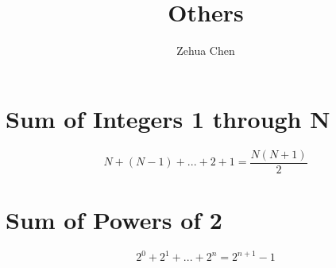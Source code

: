 \documentclass[11pt, letterpaper]{article}
\title{Others}
\author{Zehua Chen}
\begin{document}
  \section{Sum of Integers 1 through N}

    \begin{equation}
      N + \left( N - 1 \right) + ... + 2 + 1 = \frac{N \left( N + 1 \right)}{2}
    \end{equation}

  \section{Sum of Powers of 2}

    \begin{equation}
      2^{0} + 2^{1} + ... + 2^{n} = 2^{n + 1} - 1
    \end{equation}
\end{document}
